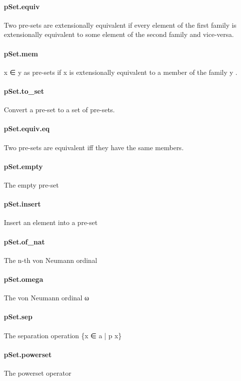 \documentclass{article}
\begin{document}
\paragraph{pSet.equiv}
\par
Two pre-sets are extensionally equivalent if every
element of the first family is extensionally equivalent to
some element of the second family and vice-versa.
\paragraph{pSet.mem}
\par
\colorbox[RGB]{253,246,227}{{{{\color[RGB]{101, 123, 131} x ∈ y }}}} as pre-sets if 
\colorbox[RGB]{253,246,227}{{{{\color[RGB]{101, 123, 131} x }}}} is extensionally equivalent to a member
of the family 
\colorbox[RGB]{253,246,227}{{{{\color[RGB]{101, 123, 131} y }}}}.
\paragraph{pSet.to\_set}
\par
Convert a pre-set to a 
\colorbox[RGB]{253,246,227}{{{{\color[RGB]{101, 123, 131} set }}}} of pre-sets.
\paragraph{pSet.equiv.eq}
\par
Two pre-sets are equivalent iff they have the same members.
\paragraph{pSet.empty}
\par
The empty pre-set
\paragraph{pSet.insert}
\par
Insert an element into a pre-set
\paragraph{pSet.of\_nat}
\par
The n-th von Neumann ordinal
\paragraph{pSet.omega}
\par
The von Neumann ordinal ω
\paragraph{pSet.sep}
\par
The separation operation 
\colorbox[RGB]{253,246,227}{{{{\color[RGB]{101, 123, 131} \{x ∈ a | p x\} }}}}\paragraph{pSet.powerset}
\par
The powerset operator
\end{document}
